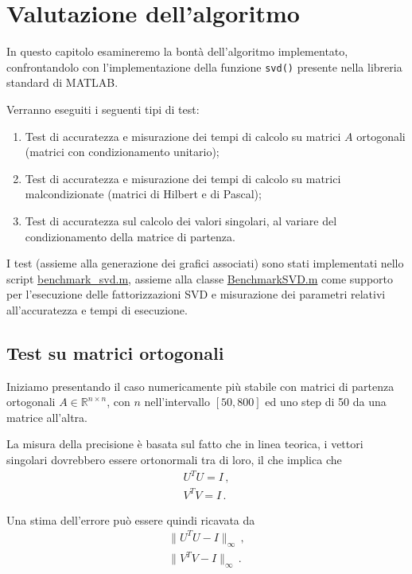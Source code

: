 \chapter{Valutazione dell'algoritmo}
In questo capitolo esamineremo la bontà dell'algoritmo implementato, 
confrontandolo con l'implementazione della funzione \texttt{svd()} presente nella 
libreria standard di MATLAB.

Verranno eseguiti i seguenti tipi di test:

\begin{enumerate}
	\item Test di accuratezza e misurazione dei tempi di calcolo su matrici $A$ 
ortogonali (matrici con condizionamento unitario);
	
	\item Test di accuratezza e misurazione dei tempi di calcolo su matrici 
malcondizionate (matrici di Hilbert e di Pascal);
	
	\item Test di accuratezza sul calcolo dei valori singolari, al variare del 
condizionamento della matrice di partenza.
\end{enumerate}

I test (assieme alla generazione dei grafici associati) sono stati implementati 
nello script 
\href{https://github.com/Yagotzirck/svd_benchmark/blob/main/src/benchmark_svd.m}{benchmark\_svd.m}, 
assieme alla classe 
\href{https://github.com/Yagotzirck/svd_benchmark/blob/main/src/BenchmarkSVD.m}{BenchmarkSVD.m} 
come supporto per l'esecuzione delle fattorizzazioni SVD e misurazione dei 
parametri relativi all'accuratezza e tempi di esecuzione.

\newpage
\section{Test su matrici ortogonali}
Iniziamo presentando il caso numericamente più stabile con matrici di partenza 
ortogonali $A \in \mathbb{R}^{n \times n}$, con $n$ nell'intervallo $[50, 800]$ 
ed uno step di 50 da una matrice all'altra.

La misura della precisione è basata sul fatto che in linea teorica, i vettori 
singolari dovrebbero essere ortonormali tra di loro, il che implica che
\begin{gather*}
	U^T U = I \,, \\
	V^T V = I \,.
\end{gather*}

Una stima dell'errore può essere quindi ricavata da
\begin{gather*}
	\| U^T U - I \|_\infty \,, \\
	\| V^T V - I \|_\infty \,.
\end{gather*}

